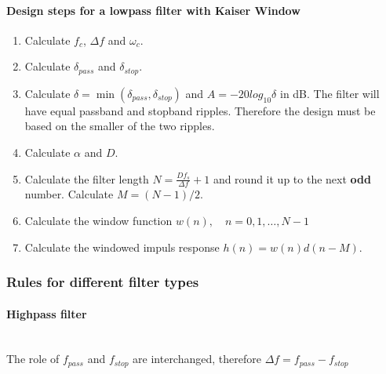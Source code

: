 \paragraph{Design steps for a lowpass filter with Kaiser Window}
\begin{enumerate}
\item Calculate $f_c$, $\Delta f$ and $\omega_c$.
\item Calculate $\delta_{pass}$ and $\delta_{stop}$.
\item Calculate $\delta=\min(\delta_{pass},\delta_{stop})$ and $A=-20log_{10}\delta$ in dB. \newline
	  The filter will have equal passband and stopband ripples. Therefore the design must be based on the smaller of the two ripples.
\item Calculate $\alpha$ and $D$.
\item Calculate the filter length $N=\frac{Df_s}{\Delta f}+1$ and round it up to the next \textbf{odd} number. Calculate $M=(N-1)/2$.
\item Calculate the window function $w(n),\quad n=0,1,\dots,N-1$
\item Calculate the windowed impuls response $h(n)=w(n)d(n-M)$.
\end{enumerate}

\subsubsection{Rules for different filter types}
\paragraph{Highpass filter}~\\
The role of $f_{pass}$ and $f_{stop}$ are interchanged, therefore $\Delta f = f_{pass}-f_{stop}$

